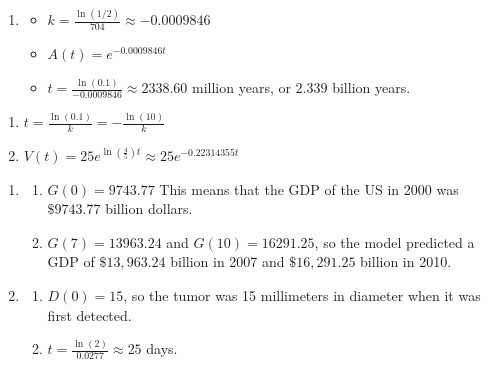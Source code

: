 \documentclass{ximera}
\begin{document}
\begin{enumerate}
\setcounter{enumi}{\value{HW}}

\item  \begin{itemize}  \item $k = \frac{\ln(1/2)}{704} \approx -0.0009846$

\item $A(t) = e^{-0.0009846t}$

\item $t = \frac{\ln(0.1)}{-0.0009846} \approx 2338.60$ million years, or $2.339$ billion years.

\end{itemize}


\setcounter{HW}{\value{enumi}}
\end{enumerate}

\begin{multicols}{2}
\begin{enumerate}
\setcounter{enumi}{\value{HW}}


\item  $t = \frac{\ln(0.1)}{k} = -\frac{\ln(10)}{k}$

\item $V(t) = 25e^{\ln\left(\frac{4}{5}\right)t} \approx 25e^{-0.22314355t}$

\setcounter{HW}{\value{enumi}}
\end{enumerate}
\end{multicols}


\begin{enumerate}
\setcounter{enumi}{\value{HW}}


\item \begin{enumerate}  \item  $G(0) = 9743.77$  This means that the GDP of the US in 2000 was $\$9743.77$ billion dollars.

\item  $G(7) = 13963.24$ and $G(10) = 16291.25$, so the model predicted a GDP of $\$ 13,963.24$ billion in 2007 and $\$ 16,291.25$ billion in 2010. 

\end{enumerate}

\item \begin{enumerate} \item $D(0) = 15$, so the tumor was 15 millimeters in diameter when it was first detected.

\item  $t = \frac{\ln(2)}{0.0277} \approx 25$ days.

\end{enumerate}

\setcounter{HW}{\value{enumi}}
\end{enumerate}
\end{document}
